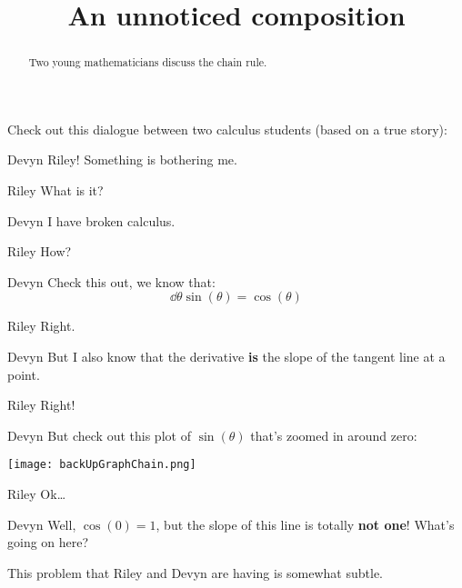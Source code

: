 \documentclass{ximera}
\title[Break-Ground:]{An unnoticed composition}
\begin{document}
\begin{abstract}
Two young mathematicians discuss the chain rule.
\end{abstract}
\maketitle

Check out this dialogue between two calculus students (based on a true
story):

\begin{dialogue}
\item[Devyn] Riley! Something is bothering me. 
\item[Riley] What is it?
\item[Devyn] I have broken calculus. 
\item[Riley] How?
\item[Devyn] Check this out, we know that:
  \[
  \dd{\theta} \sin(\theta) = \cos(\theta)
  \]
\item[Riley] Right. 
\item[Devyn] But I also know that the derivative \textbf{is} the slope
  of the tangent line at a point.
\item[Riley] Right!
\item[Devyn] But check out this plot of $\sin(\theta)$ that's zoomed in around zero:
  \begin{image}
    \texttt{[image: backUpGraphChain.png]}
  \end{image}
\item[Riley] Ok\dots
\item[Devyn] Well, $\cos(0) = 1$, but the slope of this line is
  totally \textbf{not one}! What's going on here?
\end{dialogue}

This problem that Riley and Devyn are having is somewhat subtle. 
\end{document}
